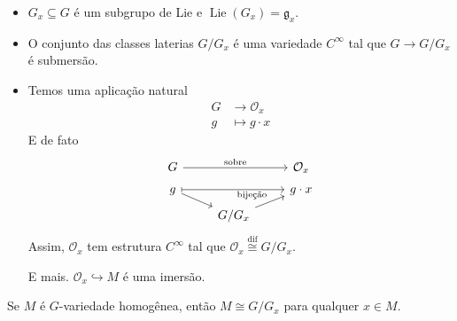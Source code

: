 \begin{prop}\leavevmode 
	\begin{itemize}
	\item $G_x\subseteq G$ é um subgrupo de Lie e $\operatorname{Lie}(G_x) =\mathfrak{g}_x$.
	\item O conjunto das classes laterias $G/G_x$  é uma variedade $C^\infty$ tal que $G\to G/G_x$ é submersão.

	\item Temos uma aplicação natural 
		 \begin{align*}
			G &\longrightarrow \mathcal{O}_x \\
			g &\longmapsto g\cdot x
		\end{align*}
		E de fato
		\[\begin{tikzcd}[row sep=tiny]
			G\arrow[rr,"\text{sobre} "]&&\mathcal{O}_x\\
			g\arrow[rr,maps to]\arrow[dr]&& g\cdot x\\
			& G/G_x\arrow[ur,"\text{bijeção} "]
		\end{tikzcd}\]
		Assim, $\mathcal{O}_x$ tem estrutura $C^\infty$ tal que $\mathcal{O}_x \overset{\operatorname{dif}}{\cong } G/G_x$.

		E mais. $\mathcal{O}_x\hookrightarrow M$ é uma imersão.
		
	\end{itemize}
\end{prop}

\begin{remark}
	Se $M$ é $G$-variedade homogênea, então $M\cong G/G_x$ para qualquer  $x\in M$.
\end{remark}

